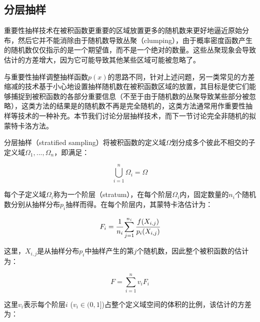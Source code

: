 \subsection{分层抽样}
重要性抽样技术在被积函数更重要的区域放置更多的随机数来更好地逼近原始分布，然后它并不能消除由于随机数导致丛聚（clumping），由于概率密度函数产生的随机数仅仅指示的是一个期望值，而不是一个绝对的数量。这些丛聚现象会导致估计的方差增大，因为它可能导致其他某些区域可能被忽略了。

与重要性抽样调整抽样函数$p(x)$的思路不同，针对上述问题，另一类常见的方差缩减的技术基于小心地设置抽样随机数在被积函数区域的放置，其目标是使它们能够捕捉到被积函数的各部分重要信息（不至于由于随机数的丛聚导致某些部分被忽略），这类方法的结果是的随机数不再是完全随机的，这类方法通常用作重要性抽样等技术的一种补充。本节我们讨论分层抽样技术，而下一节讨论完全非随机的拟蒙特卡洛方法。

分层抽样（stratified sampling）将被积函数的定义域$\Omega$划分成多个彼此不相交的子定义域$\Omega_1,...,\Omega_n$，即满足：

\begin{equation}
	\bigcup_{i=1}^{n}\Omega_i=\Omega
\end{equation}

\noindent 每个子定义域$\Omega_i$称为一个阶层（stratum），在每个阶层$\Omega_i$内，固定数量的$n_i$个随机数分别从抽样分布$p_i$抽样而得。在每个阶层内，其蒙特卡洛估计为：

\begin{equation}
	F_i= \cfrac{1}{n_i}\sum_{j=1}^{n_i} \cfrac{f(X_{i,j})}{p_i(X_{i,j})}
\end{equation} 

\noindent 这里，$X_{i,j}$是从抽样分布$p_i$中抽样产生的第$j$个随机数，因此整个被积函数的估计为：

\begin{equation}
	F=\sum_{i=1}^{n}v_iF_i
\end{equation}

\noindent 这里$v_i$表示每个阶层$i$ ($v_i\in(0,1]$)占整个定义域空间的体积的比例，该估计的方差为：

